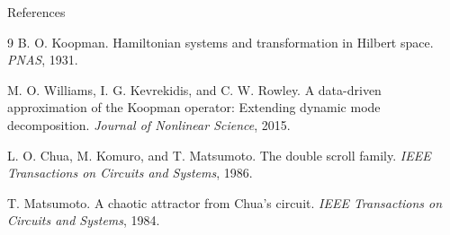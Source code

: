 \documentclass[aspectratio=169,10pt]{beamer}
\begin{document}
\begin{frame}{References}
    \small
    \begin{thebibliography}{9}
        B. O. Koopman.
        \newblock Hamiltonian systems and transformation in Hilbert space.
        \newblock \emph{PNAS}, 1931.

        M. O. Williams, I. G. Kevrekidis, and C. W. Rowley.
        \newblock A data-driven approximation of the Koopman operator: Extending dynamic mode decomposition.
        \newblock \emph{Journal of Nonlinear Science}, 2015.

        L. O. Chua, M. Komuro, and T. Matsumoto.
        \newblock The double scroll family.
        \newblock \emph{IEEE Transactions on Circuits and Systems}, 1986.

        T. Matsumoto.
        \newblock A chaotic attractor from Chua's circuit.
        \newblock \emph{IEEE Transactions on Circuits and Systems}, 1984.
    \end{thebibliography}
\end{frame}
\end{document}
